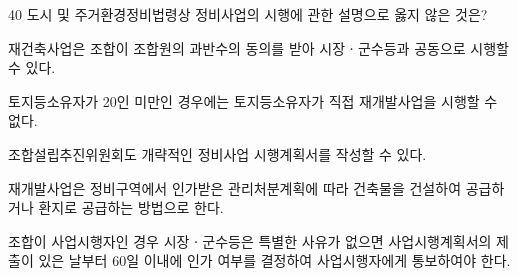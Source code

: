\begin{question}{40}
도시 및 주거환경정비법령상 정비사업의 시행에 관한 설명으로 옳지 않은 것은?
\begin{choices}
  \item 재건축사업은 조합이 조합원의 과반수의 동의를 받아 시장ㆍ군수등과 공동으로 시행할 수 있다.
  \item 토지등소유자가 20인 미만인 경우에는 토지등소유자가 직접 재개발사업을 시행할 수 없다.
  \item 조합설립추진위원회도 개략적인 정비사업 시행계획서를 작성할 수 있다.
  \item 재개발사업은 정비구역에서 인가받은 관리처분계획에 따라 건축물을 건설하여 공급하거나 환지로 공급하는 방법으로 한다.
  \item 조합이 사업시행자인 경우 시장ㆍ군수등은 특별한 사유가 없으면 사업시행계획서의 제출이 있은 날부터 60일 이내에 인가 여부를 결정하여 사업시행자에게 통보하여야 한다.
\end{choices}
\end{question}
